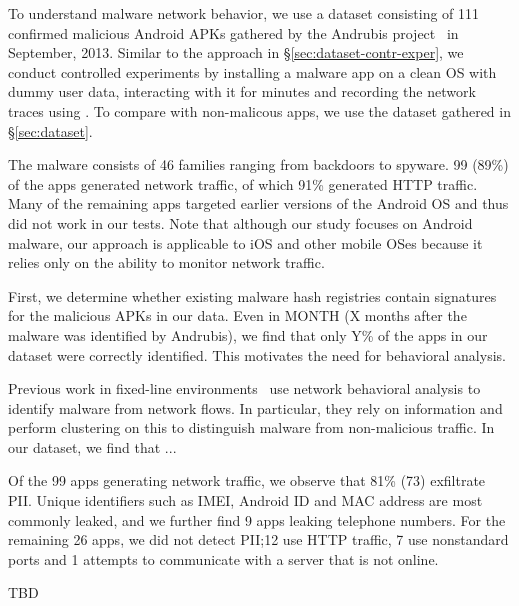  To understand malware network behavior, we use a 
dataset consisting of 111 confirmed malicious Android APKs gathered by the Andrubis project~\cite{andrubis} in September, 2013.  
Similar to the approach in \S\ref{sec:dataset-contr-exper}, we conduct controlled experiments by installing 
a malware app on a clean OS with dummy user data, interacting with it for  minutes and recording the 
network traces using \meddle. To compare with non-malicous apps, we use the dataset gathered in \S\ref{sec:dataset}.

The malware consists of 46 families ranging from backdoors to spyware.  99 (89\%) of the apps generated network 
traffic, of which 91\% generated HTTP traffic. Many of the remaining apps targeted earlier versions of the Android 
OS and thus did not work in our tests. Note that although our study focuses on Android malware, our approach 
is applicable to iOS and other mobile OSes because it relies only on the ability to monitor network traffic.

 First, we determine whether existing malware hash registries 
contain signatures for the malicious APKs in our data. Even in MONTH (X months after the malware was identified 
by Andrubis), we find that only Y\% of the apps in our dataset were correctly identified. This motivates the need 
for behavioral analysis.

Previous work in fixed-line environments~\cite{perdisci:malwaresig} use network behavioral analysis to identify malware 
from network flows. In particular, they rely on \useragent information and perform clustering on this to distinguish 
malware from non-malicious traffic. In our dataset, we find that ...

Of the 99 apps generating network traffic, we observe that 81\% (73)  
exfiltrate PII. Unique identifiers such as IMEI, Android ID and MAC address are most commonly leaked, and 
we further find 9 apps leaking telephone numbers. For the remaining 26 apps, we did not detect PII;12 use HTTP  
traffic, 7 use nonstandard ports and 1 attempts to communicate with a server that is not online. 

TBD 

%
